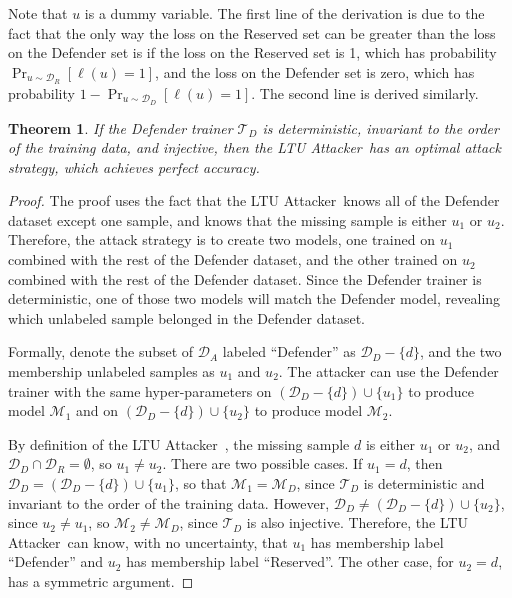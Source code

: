 \documentclass[letterpaper]{article}
\newcommand{\sminus}{-}
\newcommand{\oracle}{LTU Attacker~}
\newtheorem{theorem}{Theorem}
\begin{document}
Note that $u$ is a dummy variable. The first line of the derivation is due to the fact that the only way the loss on the Reserved set can be greater than the loss on the Defender set is if the loss on the Reserved set is 1, which has probability $\mathop{Pr}_{u \sim \mathcal{D}_R }[\ell(u)=1]$, and the loss on the Defender set is zero, which has probability $1-\mathop{Pr}_{u \sim \mathcal{D}_D }[\ell(u)=1]$. The second line is derived similarly.



\begin{theorem}\label{thm:deterministic} If the Defender trainer $\mathcal{T}_D$ is deterministic, invariant to the order of the training data, and injective, then the \oracle has an optimal attack strategy, which achieves perfect accuracy.
\end{theorem}
\begin{proof}
The proof uses the fact that the \oracle knows all of the Defender dataset except one sample, and knows that the missing sample is either $u_1$ or $u_2$.  Therefore, the attack strategy is to create two models, one trained on $u_1$ combined with the rest of the Defender dataset, and the other trained on $u_2$ combined with the rest of the Defender dataset. Since the Defender trainer is deterministic, one of those two models will match the Defender model, revealing which unlabeled sample belonged in the Defender dataset.

Formally, denote the subset of $\mathcal{D}_A$ labeled ``Defender'' as $\mathcal{D}_D\sminus\{d\}$, and the two membership unlabeled samples as $u_1$ and $u_2$. The attacker can use the Defender trainer with the same hyper-parameters on $\left(\mathcal{D}_D\sminus\{d\} \right) \cup \{u_1\}$ to produce model $\mathcal{M}_1$ and on $\left(\mathcal{D}_D\sminus\{d\} \right) \cup \{u_2\}$ to produce model $\mathcal{M}_2$.

By definition of the \oracle, the missing sample $d$ is either $u_1$ or $u_2$, and $\mathcal{D}_D \cap \mathcal{D}_R = \emptyset$, so $u_1 \ne u_2$.
There are two possible cases. If $u_1 = d$, then $\mathcal{D}_D = \left(\mathcal{D}_D\sminus\{d\} \right) \cup \{u_1\}$, so that 
$\mathcal{M}_1 = \mathcal{M}_{D}$, since $\mathcal{T}_D$ is deterministic and invariant to the order of the training data. However, $\mathcal{D}_D \ne \left(\mathcal{D}_D\sminus\{d\} \right) \cup \{u_2\}$, since $u_2 \ne u_1$, so 
$\mathcal{M}_2 \ne \mathcal{M}_{D}$,
since $\mathcal{T}_D$ is also injective. Therefore, the \oracle can know, with no uncertainty, that $u_1$ has membership label ``Defender'' and $u_2$ has membership label ``Reserved''. The other case, for $u_2 = d$, has a symmetric argument.
\end{proof}
\end{document}
